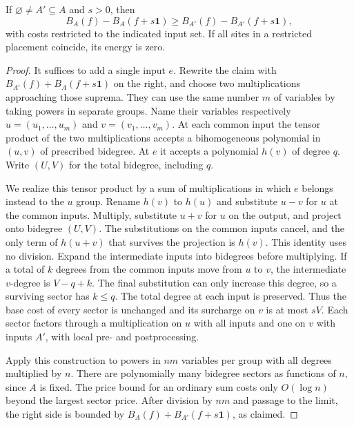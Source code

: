 \begin{lemma}\label{lem:increasing-returns}
If $\varnothing\ne A'\subseteq A$ and $s>0$, then
\begin{equation}\label{eq:src5}
 B_A(f)-B_A(f+s\mathbf1)\ge
 B_{A'}(f)-B_{A'}(f+s\mathbf1),
\end{equation}
with costs restricted to the indicated input set. If all sites in a
restricted placement coincide, its energy is zero.
\end{lemma}

\begin{proof}
It suffices to add a single input $e$. Rewrite the claim with
$B_{A'}(f)+B_A(f+s\mathbf1)$ on the right, and choose two multiplications
approaching those suprema. They can use the same number $m$ of variables
by taking powers in separate groups. Name their variables respectively
$u=(u_1,\ldots,u_m)$ and $v=(v_1,\ldots,v_m)$. At each common input the
tensor product of the two multiplications accepts a bihomogeneous
polynomial in $(u,v)$ of prescribed bidegree. At $e$ it accepts a
polynomial $h(v)$ of degree $q$. Write $(U,V)$ for the total bidegree,
including $q$.

We realize this tensor product by a sum of multiplications in which $e$
belongs instead to the $u$ group. Rename $h(v)$ to $h(u)$ and substitute
$u-v$ for $u$ at the common inputs. Multiply, substitute $u+v$ for $u$
on the output, and project onto bidegree $(U,V)$. The substitutions on
the common inputs cancel, and the only term of $h(u+v)$ that survives
the projection is $h(v)$. This identity uses no division. Expand the
intermediate inputs into bidegrees before multiplying. If a total of $k$
degrees from the common inputs move from $u$ to $v$, the intermediate
$v$-degree is $V-q+k$. The final substitution can only increase this
degree, so a surviving sector has $k\le q$. The total degree at each
input is preserved. Thus the base cost of every sector is unchanged and
its surcharge on $v$ is at most $sV$. Each sector factors through a
multiplication on $u$ with all inputs and one on $v$ with inputs $A'$,
with local pre- and postprocessing.

Apply this construction to powers in $nm$ variables per group with all
degrees multiplied by $n$. There are polynomially many bidegree sectors
as functions of $n$, since $A$ is fixed. The price bound for an ordinary
sum costs only $O(\log n)$ beyond the largest sector price. After division
by $nm$ and passage to the limit, the right side is bounded by
$B_A(f)+B_{A'}(f+s\mathbf1)$, as claimed.
\end{proof}

